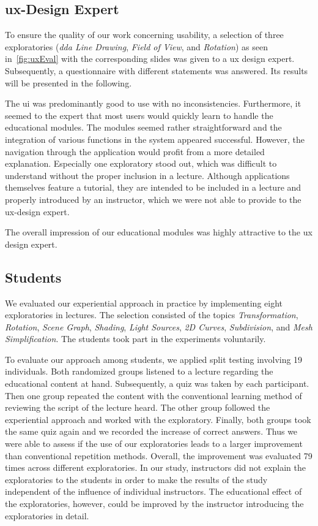\subsection{\acrshort{ux}-Design Expert} %
To ensure the quality of our work concerning usability, a selection of three exploratories (\emph{\acrshort{dda} Line Drawing}, \emph{Field of View}, and \emph{Rotation}) as seen in~\autoref{fig:uxEval} with the corresponding slides was given to a \acrfull{ux} design expert. Subsequently, a questionnaire with different statements was answered. Its results will be presented in the following.

The \acrshort{ui} was predominantly good to use with no inconsistencies. Furthermore, it seemed to the expert that most users would quickly learn to handle the educational modules. The modules seemed rather straightforward and the integration of various functions in the system appeared successful. However, the navigation through the application would profit from a more detailed explanation. Especially one exploratory stood out, which was difficult to understand without the proper inclusion in a lecture. Although applications themselves feature a tutorial, they are intended to be included in a lecture and properly introduced by an instructor, which we were not able to provide to the \acrshort{ux}-design expert. %

The overall impression of our educational modules was highly attractive to the \acrshort{ux} design expert.

\subsection{Students} %
We evaluated our experiential approach in practice by implementing eight exploratories in lectures. The selection consisted of the topics \textit{Transformation}, \textit{Rotation}, \textit{Scene Graph}, \textit{Shading}, \textit{Light Sources}, \textit{2D Curves}, \textit{Subdivision}, and \textit{Mesh Simplification}. The students took part in the experiments voluntarily.

To evaluate our approach among students, we applied split testing involving 19 individuals. Both randomized groups listened to a lecture regarding the educational content at hand. Subsequently, a quiz was taken by each participant. Then one group repeated the content with the conventional learning method of reviewing the script of the lecture heard. The other group followed the experiential approach and worked with the exploratory. Finally, both groups took the same quiz again and we recorded the increase of correct answers. Thus we were able to assess if the use of our exploratories leads to a larger improvement than conventional repetition methods. Overall, the improvement was evaluated 79 times across different exploratories. In our study, instructors did not explain the exploratories to the students in order to make the results of the study independent of the influence of individual instructors. The educational effect of the exploratories, however, could be improved by the instructor introducing the exploratories in detail.

